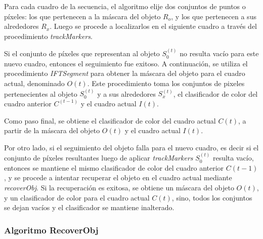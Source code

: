 Para cada cuadro de la secuencia, el algoritmo elije dos conjuntos de puntos o píxeles: los que pertenecen a la máscara del objeto $R_{o}$, y los que pertenecen a
sus alrededores $R_{x}$. Luego se procede
a localizarlos en el siguiente cuadro a través del procedimiento \textit{trackMarkers}.

Si el conjunto de píxeles que representan al objeto $S_{0}^{(t)}$ no resulta
vacío para este nuevo cuadro, entonces el seguimiento fue exitoso. A
continuación, se utiliza el procedimiento
\textit{IFTSegment} para obtener la máscara del objeto para el cuadro actual,
denominado $O{(t)}$. Este procedimiento toma los conjuntos de pixeles pertenecientes al objeto $S_{0}^{(t)}$ y
a sus alrededores $S_{x}^{(t)}$, el clasificador de color del cuadro anterior $C^{(t-1)}$ y el
cuadro actual $I{(t)}$.

Como paso final, se obtiene el clasificador de color del cuadro actual $C{(t)}$, a partir de la máscara del objeto $O{(t)}$ y el cuadro actual $I{(t)}$.

Por otro lado, si el seguimiento del objeto falla para el nuevo cuadro, es decir si el conjunto de píxeles resultantes luego de aplicar \textit{trackMarkers} $S_{0}^{(t)}$
resulta vacío, entonces se mantiene el mismo clasificador de color del cuadro anterior $C{(t-1)}$, y se procede
a intentar recuperar el objeto en el cuadro actual mediante \textit{recoverObj}. Si la recuperación
es exitosa, se obtiene un máscara del objeto $O{(t)}$, y un clasificador de color para el cuadro actual $C{(t)}$,
sino, todos los conjuntos se dejan vacíos y el clasificador se mantiene inalterado.\

\subsubsection{Algoritmo RecoverObj}

